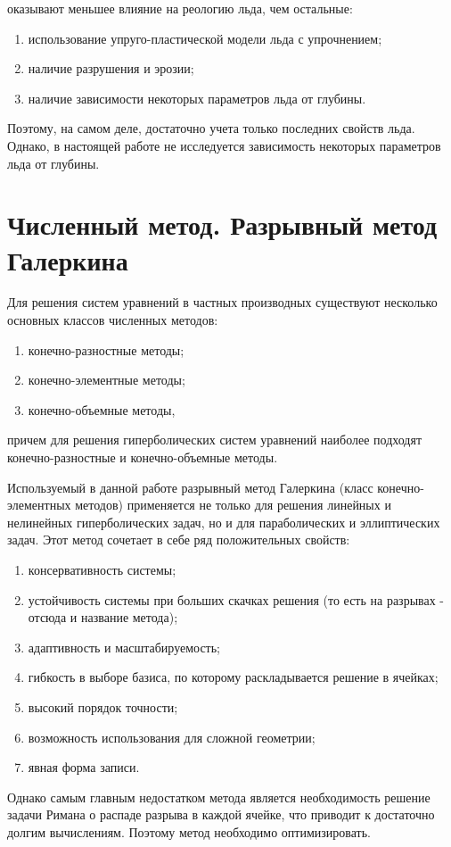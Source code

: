 \documentclass[12pt,a4paper, titlepage, openany]{book}
\begin{document}
оказывают меньшее влияние на реологию льда, чем остальные:
\begin{enumerate}
\item использование упруго-пластической модели льда с упрочнением;
\item наличие разрушения и эрозии;
\item наличие зависимости некоторых параметров льда от глубины.
\end{enumerate}
\par
Поэтому, на самом деле, достаточно учета только последних свойств льда. Однако, в настоящей работе не исследуется зависимость некоторых параметров льда от глубины.








\chapter{Численный метод. Разрывный метод Галеркина}
Для решения систем уравнений в частных производных существуют несколько основных классов численных методов:
\begin{enumerate}
\item конечно-разностные методы;
\item конечно-элементные методы;
\item конечно-объемные методы,
\end{enumerate}
причем для решения гиперболических систем уравнений наиболее подходят конечно-разностные и конечно-объемные методы. 
\par
Используемый в данной работе разрывный метод Галеркина (класс конечно-элементных методов) применяется не только для решения линейных и нелинейных гиперболических задач, но и для параболических и эллиптических задач. Этот метод сочетает в себе ряд положительных свойств:
\begin{enumerate}
\item консервативность системы;
\item устойчивость системы при больших скачках решения (то есть на разрывах - отсюда и название метода);
\item адаптивность и масштабируемость;
\item гибкость в выборе базиса, по которому раскладывается решение в ячейках;
\item высокий порядок точности;
\item возможность использования для сложной геометрии;
\item явная форма записи.
\end{enumerate}
\par
Однако самым главным недостатком метода является необходимость решение задачи Римана о распаде разрыва в каждой ячейке, что приводит к достаточно долгим вычислениям. Поэтому метод необходимо оптимизировать.
\end{document}
